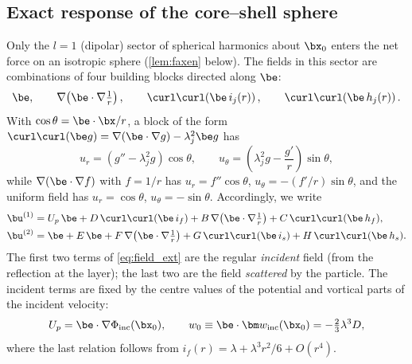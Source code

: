 \subsection{Exact response of the core--shell sphere}\label{sec:sphere}
Only the $l=1$ (dipolar) sector of spherical harmonics about $\bx_0$ enters the net force on an isotropic sphere
(\cref{lem:faxen} below). The fields in this sector are combinations of four building blocks directed along $\be$:
\begin{equation}
  \be,\qquad \nabla\!\left(\be\cdot\nabla\tfrac1r\right),\qquad
  \curl\curl\!\left(\be\, i_j(r)\right),\qquad \curl\curl\!\left(\be\, h_j(r)\right).
  \label{eq:blocks}
\end{equation}
With $\cos\theta=\be\cdot\bx/r$, a block of the form $\curl\curl(\be g)=\nabla(\be\cdot\nabla g)-\lambda_j^2\be g$ has
\begin{equation}
  u_r=\left(g''-\lambda_j^2g\right)\cos\theta,\qquad u_\theta=\left(\lambda_j^2g-\frac{g'}{r}\right)\sin\theta,
  \label{eq:vort_radial}
\end{equation}
while $\nabla(\be\cdot\nabla f)$ with $f=1/r$ has $u_r=f''\cos\theta$, $u_\theta=-(f'/r)\sin\theta$, and the uniform
field has $u_r=\cos\theta$, $u_\theta=-\sin\theta$. Accordingly, we write
\begin{subequations}\label{eq:fields}
\begin{align}
  \bu^{(1)}&=U_p\,\be+D\,\curl\curl(\be\, i_f)
  +B\,\nabla\!\left(\be\cdot\nabla\tfrac1r\right)+C\,\curl\curl(\be\, h_f),
  \label{eq:field_ext}\\
  \bu^{(2)}&=\be+E\,\be+F\,\nabla\!\left(\be\cdot\nabla\tfrac1r\right)
  +G\,\curl\curl(\be\, i_s)+H\,\curl\curl(\be\, h_s).
  \label{eq:field_shell}
\end{align}
\end{subequations}
The first two terms of \cref{eq:field_ext} are the regular \emph{incident} field (from the reflection at the layer); the
last two are the field \emph{scattered} by the particle. The incident terms are fixed by the centre values of the
potential and vortical parts of the incident velocity:
\begin{equation}
  U_p=\be\cdot\nabla\Phi_{\rm inc}(\bx_0),\qquad
  w_0\equiv\be\cdot\bm w_{\rm inc}(\bx_0)=-\tfrac23\lambda^3D,
  \label{eq:centre_values}
\end{equation}
where the last relation follows from $i_f(r)=\lambda+\lambda^3r^2/6+O(r^4)$.

